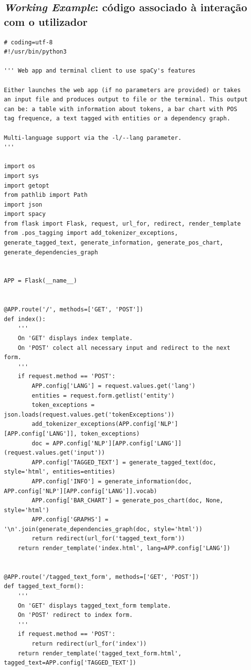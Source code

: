 \documentclass[12pt]{article}
\begin{document}
\newpage

\subsection{\textit{Working Example}: código associado à interação com o utilizador}
\label{anexo:working_example_2}
\begin{verbatim}
# coding=utf-8
#!/usr/bin/python3

''' Web app and terminal client to use spaCy's features

Either launches the web app (if no parameters are provided) or takes an input file and produces output to file or the terminal. This output can be: a table with information about tokens, a bar chart with POS tag frequence, a text tagged with entities or a dependency graph.

Multi-language support via the -l/--lang parameter.
'''

import os
import sys
import getopt
from pathlib import Path
import json
import spacy
from flask import Flask, request, url_for, redirect, render_template
from .pos_tagging import add_tokenizer_exceptions, generate_tagged_text, generate_information, generate_pos_chart, generate_dependencies_graph


APP = Flask(__name__)


@APP.route('/', methods=['GET', 'POST'])
def index():
    '''
    On 'GET' displays index template.
    On 'POST' colect all necessary input and redirect to the next form.
    '''
    if request.method == 'POST':
        APP.config['LANG'] = request.values.get('lang')
        entities = request.form.getlist('entity')
        token_exceptions = json.loads(request.values.get('tokenExceptions'))
        add_tokenizer_exceptions(APP.config['NLP'][APP.config['LANG']], token_exceptions)
        doc = APP.config['NLP'][APP.config['LANG']](request.values.get('input'))
        APP.config['TAGGED_TEXT'] = generate_tagged_text(doc, style='html', entities=entities)
        APP.config['INFO'] = generate_information(doc, APP.config['NLP'][APP.config['LANG']].vocab)
        APP.config['BAR_CHART'] = generate_pos_chart(doc, None, style='html')
        APP.config['GRAPHS'] = '\n'.join(generate_dependencies_graph(doc, style='html'))
        return redirect(url_for('tagged_text_form'))
    return render_template('index.html', lang=APP.config['LANG'])


@APP.route('/tagged_text_form', methods=['GET', 'POST'])
def tagged_text_form():
    '''
    On 'GET' displays tagged_text_form template.
    On 'POST' redirect to index form.
    '''
    if request.method == 'POST':
        return redirect(url_for('index'))
    return render_template('tagged_text_form.html', tagged_text=APP.config['TAGGED_TEXT'])



\end{verbatim}
\end{document}
